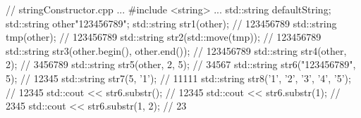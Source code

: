 \begin{cpp}
// stringConstructor.cpp
...
#include <string>
...
std::string defaultString;
std::string other{"123456789"};
std::string str1(other); // 123456789
std::string tmp(other); // 123456789
std::string str2(std::move(tmp)); // 123456789
std::string str3(other.begin(), other.end()); // 123456789
std::string str4(other, 2); // 3456789
std::string str5(other, 2, 5); // 34567
std::string str6("123456789", 5); // 12345
std::string str7(5, '1'); // 11111
std::string str8({'1', '2', '3', '4', '5'}); // 12345
std::cout << str6.substr(); // 12345
std::cout << str6.substr(1); // 2345
std::cout << str6.substr(1, 2); // 23
\end{cpp}































